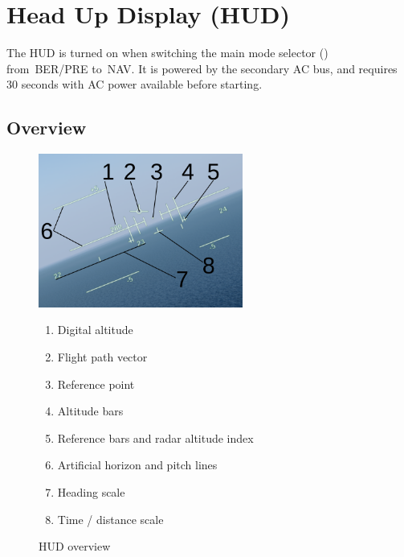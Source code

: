 \section{Head Up Display (HUD)}
The HUD is turned on when switching the main mode selector
() from~BER/PRE to~NAV.
It is powered by the secondary AC bus, and requires 30 seconds with AC power available before starting.

\subsection{Overview}
\begin{figure}[!ht]
  \centering
  \includegraphics[width=0.6\textwidth]{images/displays/ajs-hud-general.png}

  \begin{multicols}{2}
    \begin{enumerate}[nosep]
      \item \label{item:digalt} Digital altitude
      \item \label{item:fpv} Flight path vector
      \item \label{item:refpt} Reference point
      \item \label{item:alt} Altitude bars
      \item \label{item:refbars} Reference bars and radar altitude index
      \item \label{item:horizon} Artificial horizon and pitch lines
      \item \label{item:heading} Heading scale
      \item \label{item:timeline} Time / distance scale
    \end{enumerate}
  \end{multicols}

  \caption{HUD overview}
  \label{fig:hud}
\end{figure}

